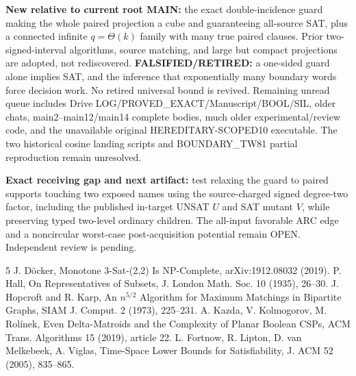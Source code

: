 \documentclass[11pt]{article}
\begin{document}
\textbf{New relative to current root MAIN:} the exact double-incidence guard making the whole paired projection a cube and guaranteeing all-source SAT, plus a connected infinite $q=\Theta(k)$ family with many true paired clauses. Prior two-signed-interval algorithms, source matching, and large but compact projections are adopted, not rediscovered. \textbf{FALSIFIED/RETIRED:} a one-sided guard alone implies SAT, and the inference that exponentially many boundary words force decision work. No retired universal bound is revived. Remaining unread queue includes Drive LOG/PROVED\_EXACT/Manuscript/BOOL/SIL, older chats, main2--main12/main14 complete bodies, much older experimental/review code, and the unavailable original HEREDITARY-SCOPED10 executable. The two historical cosine landing scripts and BOUNDARY\_TW81 partial reproduction remain unresolved.

\textbf{Exact receiving gap and next artifact:} test relaxing the guard to paired supports touching two exposed names using the source-charged signed degree-two factor, including the published in-target UNSAT $U$ and SAT mutant $V$, while preserving typed two-level ordinary children. The all-input favorable ARC edge and a noncircular worst-case post-acquisition potential remain OPEN. Independent review is pending.
\begin{thebibliography}{5}
 J. D\"ocker, Monotone 3-Sat-(2,2) Is NP-Complete, arXiv:1912.08032 (2019).
 P. Hall, On Representatives of Subsets, J. London Math. Soc. 10 (1935), 26--30.
 J. Hopcroft and R. Karp, An $n^{5/2}$ Algorithm for Maximum Matchings in Bipartite Graphs, SIAM J. Comput. 2 (1973), 225--231.
 A. Kazda, V. Kolmogorov, M. Rol\'inek, Even Delta-Matroids and the Complexity of Planar Boolean CSPs, ACM Trans. Algorithms 15 (2019), article 22.
 L. Fortnow, R. Lipton, D. van Melkebeek, A. Viglas, Time-Space Lower Bounds for Satisfiability, J. ACM 52 (2005), 835--865.
\end{thebibliography}
\end{document}
